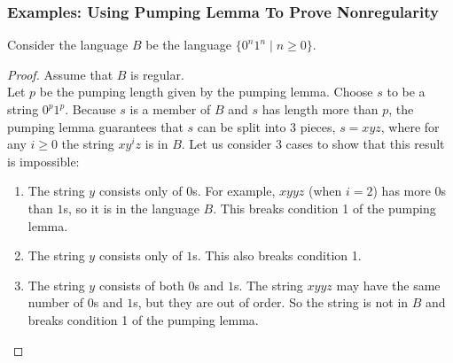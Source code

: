 \documentclass[11pt,a4paper]{article}
\begin{document}
\subsubsection{Examples: Using Pumping Lemma To Prove Nonregularity}
\begin{example}
    Consider the language $B$ be the language $\{0^n1^n\mid n\geq 0\}$.

    \begin{proof}
        Assume that $B$ is regular. \\
        
        Let $p$ be the pumping length given by the pumping lemma.
        Choose $s$ to be a string $0^p1^p$. Because $s$ is a member of $B$ and $s$ has length more than $p$, the pumping lemma guarantees that $s$ can be split into 3 pieces, $s=xyz$, where for any $i\geq 0$ the string $xy^iz$ is in $B$.
        Let us consider 3 cases to show that this result is impossible:

        \begin{enumerate}
            \item The string $y$ consists only of $0$s. For example, $xyyz$ (when $i=2$) has more $0$s than $1$s, so it is in the language $B$. This breaks condition 1 of the pumping lemma.
            \item The string $y$ consists only of $1$s. This also breaks condition 1.
            \item The string $y$ consists of both $0$s and $1$s. The string $xyyz$ may have the same number of $0$s and $1$s, but they are out of order. So the string is not in $B$ and breaks condition 1 of the pumping lemma.
        \end{enumerate}
    \end{proof}
\end{example}
\end{document}
